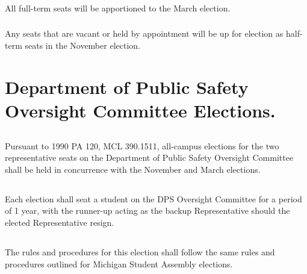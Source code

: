 \subsubsection{}
All full-term seats will be apportioned to the March election.
\subsubsection{}
Any seats that are vacant or held by appointment will be up for election as half-term seats in the November election.


\section{Department of Public Safety Oversight Committee Elections.}
\subsection{}
Pursuant to 1990 PA 120, MCL 390.1511, all-campus elections for the two representative seats on the Department of Public Safety Oversight Committee shall be held in concurrence with the November and March elections.
\subsection{}
Each election shall seat a student on the DPS Oversight Committee for a period of 1 year, with the runner-up acting as the backup Representative should the elected Representative resign.
\subsection{}
The rules and procedures for this election shall follow the same rules and procedures outlined for Michigan Student Assembly elections.

